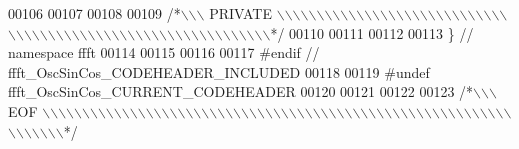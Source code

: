 \begin{DoxyCode}
00106 
00107 
00108 
00109 \textcolor{comment}{/*\(\backslash\)\(\backslash\)\(\backslash\) PRIVATE \(\backslash\)\(\backslash\)\(\backslash\)\(\backslash\)\(\backslash\)\(\backslash\)\(\backslash\)\(\backslash\)\(\backslash\)\(\backslash\)\(\backslash\)\(\backslash\)\(\backslash\)\(\backslash\)\(\backslash\)\(\backslash\)\(\backslash\)\(\backslash\)\(\backslash\)\(\backslash\)\(\backslash\)\(\backslash\)\(\backslash\)\(\backslash\)\(\backslash\)\(\backslash\)\(\backslash\)\(\backslash\)\(\backslash\)\(\backslash\)\(\backslash\)\(\backslash\)\(\backslash\)\(\backslash\)\(\backslash\)\(\backslash\)\(\backslash\)\(\backslash\)\(\backslash\)\(\backslash\)\(\backslash\)\(\backslash\)\(\backslash\)\(\backslash\)\(\backslash\)\(\backslash\)\(\backslash\)\(\backslash\)\(\backslash\)\(\backslash\)\(\backslash\)\(\backslash\)\(\backslash\)\(\backslash\)\(\backslash\)\(\backslash\)\(\backslash\)\(\backslash\)\(\backslash\)\(\backslash\)\(\backslash\)\(\backslash\)*/}
00110 
00111 
00112 
00113 \}   \textcolor{comment}{// namespace ffft}
00114 
00115 
00116 
00117 \textcolor{preprocessor}{#endif  // ffft\_OscSinCos\_CODEHEADER\_INCLUDED}
00118 
00119 \textcolor{preprocessor}{#undef ffft\_OscSinCos\_CURRENT\_CODEHEADER}
00120 
00121 
00122 
00123 \textcolor{comment}{/*\(\backslash\)\(\backslash\)\(\backslash\) EOF \(\backslash\)\(\backslash\)\(\backslash\)\(\backslash\)\(\backslash\)\(\backslash\)\(\backslash\)\(\backslash\)\(\backslash\)\(\backslash\)\(\backslash\)\(\backslash\)\(\backslash\)\(\backslash\)\(\backslash\)\(\backslash\)\(\backslash\)\(\backslash\)\(\backslash\)\(\backslash\)\(\backslash\)\(\backslash\)\(\backslash\)\(\backslash\)\(\backslash\)\(\backslash\)\(\backslash\)\(\backslash\)\(\backslash\)\(\backslash\)\(\backslash\)\(\backslash\)\(\backslash\)\(\backslash\)\(\backslash\)\(\backslash\)\(\backslash\)\(\backslash\)\(\backslash\)\(\backslash\)\(\backslash\)\(\backslash\)\(\backslash\)\(\backslash\)\(\backslash\)\(\backslash\)\(\backslash\)\(\backslash\)\(\backslash\)\(\backslash\)\(\backslash\)\(\backslash\)\(\backslash\)\(\backslash\)\(\backslash\)\(\backslash\)\(\backslash\)\(\backslash\)\(\backslash\)\(\backslash\)\(\backslash\)\(\backslash\)\(\backslash\)\(\backslash\)\(\backslash\)\(\backslash\)*/}
\end{DoxyCode}
